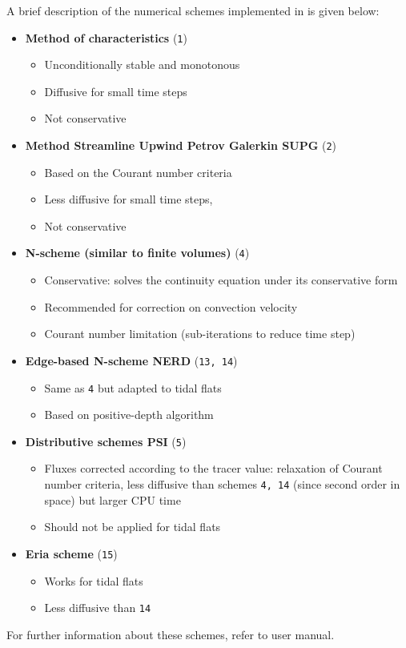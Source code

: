 A brief description of the numerical schemes implemented in \gaia{} is given below:
\begin{itemize}
\item \textbf{Method of characteristics} (\texttt{1})
\begin{itemize}
\item Unconditionally stable and monotonous
\item Diffusive for small time steps
\item Not conservative
\end{itemize}
\item \textbf{Method Streamline Upwind Petrov Galerkin SUPG} (\texttt{2})
\begin{itemize}
\item Based on the Courant number criteria
\item Less diffusive for small time steps,
\item Not conservative
\end{itemize}
\item \textbf{N-scheme (similar to finite volumes)} (\texttt{4})
\begin{itemize}
\item Conservative: solves the continuity equation under its conservative form
\item Recommended for correction on convection velocity
\item Courant number limitation (sub-iterations to reduce time step)
\end{itemize}
\item \textbf{Edge-based N-scheme NERD} (\texttt{13, 14})
\begin{itemize}
\item Same as \texttt{4} but adapted to tidal flats
\item Based on positive-depth algorithm
\end{itemize}
\item \textbf{Distributive schemes PSI} (\texttt{5})
\begin{itemize}
\item Fluxes corrected according to the tracer value: relaxation of Courant number criteria, less diffusive than
schemes \texttt{4, 14} (since second order in space) but larger CPU time
\item Should not be applied for tidal flats
\end{itemize}
\item \textbf{Eria scheme} (\texttt{15})
\begin{itemize}
\item Works for tidal flats
\item Less diffusive than \texttt{14}
\end{itemize}
\end{itemize}
For further information about these schemes, refer to  user manual.

